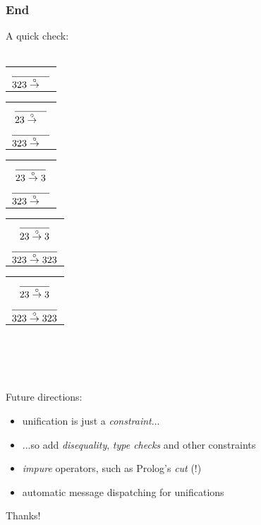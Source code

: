 \documentclass[9pt]{beamer}
\begin{document}
\begin{frame}[fragile]
\frametitle{End}
A quick check:
\\\\
\begin{overprint}
    \begin{tabular}{c}
        $\displaystyle { \over 323 \stackrel{\circ}{\rightarrow}\quad } $\\
    \end{tabular}
    \begin{tabular}{c}
        $\displaystyle { \over 23 \stackrel{\circ}{\rightarrow}\quad } $\\
        $\displaystyle {   \over 323 \stackrel{\circ}{\rightarrow}\quad } $\\
    \end{tabular}
    \begin{tabular}{c}
        $\displaystyle { \over 23 \stackrel{\circ}{\rightarrow} 3} $\\
        $\displaystyle {   \over 323 \stackrel{\circ}{\rightarrow}\quad } $\\
    \end{tabular}
    \begin{tabular}{c}
        $\displaystyle { \over 23 \stackrel{\circ}{\rightarrow} 3} $\\
        $\displaystyle {   \over 323 \stackrel{\circ}{\rightarrow}323 } $\\
    \end{tabular}
    \begin{tabular}{c}
        $\displaystyle { \over 23 \stackrel{\circ}{\rightarrow} 3} $\\
        $\displaystyle {   \over 323 \stackrel{\circ}{\rightarrow}323 } $\\
    \end{tabular}
    \\\\\\\\
    Future directions:
    \begin{itemize}
        \item unification is just a \textit{constraint}...
        \item ...so add \textit{disequality}, \textit{type checks} and other constraints
        \item \textit{impure} operators, such as Prolog's \textit{cut} (!)
        \item automatic message dispatching for unifications
    \end{itemize}
\end{overprint}

\end{frame}

\fi

\begin{frame}{ }
\Huge Thanks!
\end{frame}
\end{document}
